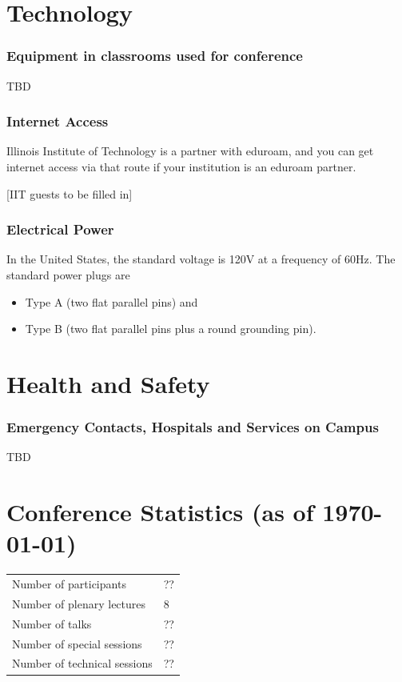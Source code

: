 

\section{Technology}

\subsubsection{Equipment in classrooms used for conference}

TBD


\subsubsection{Internet Access}

Illinois Institute of Technology is a partner with eduroam, and you can get internet access via that route if your institution is an eduroam partner.

[IIT guests to be filled in]

\subsubsection{Electrical Power}

In the United States, the standard voltage is 120V at a frequency of 60Hz.  The standard power plugs are 
\begin{itemize}
	\item Type A (two flat parallel pins) and 
	\item Type B (two flat parallel pins plus a round grounding pin).
\end{itemize}

\section{Health and Safety}


\subsubsection{Emergency Contacts, Hospitals and Services on Campus}

TBD



\section{Conference Statistics (as of \today)}

\begin{center}
 \begin{tabular}{ll}
 Number of participants & ?? \\
 Number of plenary lectures & 8 \\
 Number of talks & ?? \\
 Number of special sessions & ?? \\
 Number of technical sessions & ?? \\
 \end{tabular}
\end{center}
